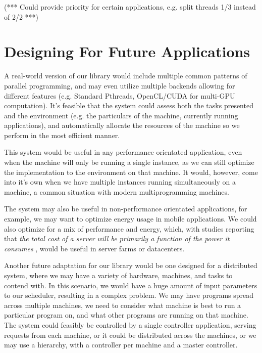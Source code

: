 (*** Could provide priority for certain applications, e.g. split threads 1/3 instead of 2/2 ***)



\section{Designing For Future Applications}

A real-world version of our library would include multiple common patterns of parallel programming, and may even utilize multiple backends allowing for different features (e.g. Standard Pthreads, OpenCL/CUDA for multi-GPU computation). It's feasible that the system could assess both the tasks presented and the environment (e.g. the particulars of the machine, currently running applications), and automatically allocate the resources of the machine so we perform in the most efficient manner.

This system would be useful in any performance orientated application, even when the machine will only be running a single instance, as we can still optimize the implementation to the environment on that machine. It would, however, come into it's own when we have multiple instances running simultaneously on a machine, a common situation with modern multiprogramming machines.

The system may also be useful in non-performance orientated applications, for example, we may want to optimize energy usage in mobile applications. We could also optimize for a mix of performance and energy, which, with studies reporting that \textit{the total cost of a server will be primarily a function of the power it consumes} \cite{datacenters}, would be useful in server farms or datacenters.

Another future adaptation for our library would be one designed for a distributed system, where we may have a variety of hardware, machines, and tasks to contend with. In this scenario, we would have a huge amount of input parameters to our scheduler, resulting in a complex problem. We may have programs spread across multiple machines, we need to consider what machine is best to run a particular program on, and what other programs are running on that machine. The system could feasibly be controlled by a single controller application, serving requests from each machine, or it could be distributed across the machines, or we may use a hierarchy, with a controller per machine and a master controller. 
